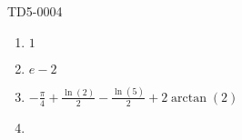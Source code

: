 
\begin{corrige}{TD5-0004}

	\begin{enumerate}
		\item
			$1$
		\item
			$e-2$
		\item
			$-\frac{ \pi }{ 4 } + \frac{ \ln(2) }{2} - \frac{ \ln(5) }{2} + 2\arctan(2)$
		\item
	\end{enumerate}
	
\end{corrige}
